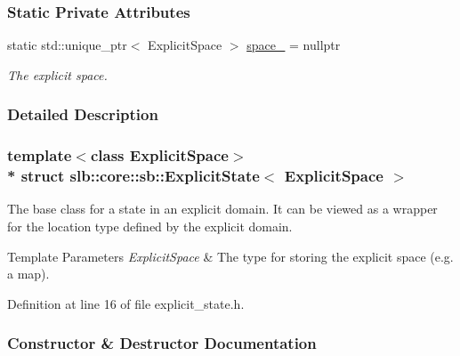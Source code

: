\subsubsection*{Static Private Attributes}
\begin{DoxyCompactItemize}
\item 
static std\+::unique\+\_\+ptr$<$ Explicit\+Space $>$ \hyperlink{structslb_1_1core_1_1sb_1_1ExplicitState_aec671efc84838fa7d339cb7316758e59}{space\+\_\+} = nullptr\hypertarget{structslb_1_1core_1_1sb_1_1ExplicitState_aec671efc84838fa7d339cb7316758e59}{}\label{structslb_1_1core_1_1sb_1_1ExplicitState_aec671efc84838fa7d339cb7316758e59}

\begin{DoxyCompactList}\small\item\em The explicit space. \end{DoxyCompactList}\end{DoxyCompactItemize}


\subsubsection{Detailed Description}
\subsubsection*{template$<$class Explicit\+Space$>$\\*
struct slb\+::core\+::sb\+::\+Explicit\+State$<$ Explicit\+Space $>$}

The base class for a state in an explicit domain. It can be viewed as a wrapper for the location type defined by the explicit domain. 


\begin{DoxyTemplParams}{Template Parameters}
{\em Explicit\+Space} & The type for storing the explicit space (e.\+g. a map). \\
\hline
\end{DoxyTemplParams}


Definition at line 16 of file explicit\+\_\+state.\+h.



\subsubsection{Constructor \& Destructor Documentation}
